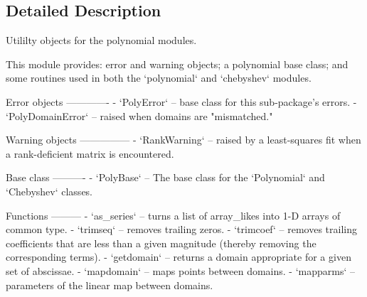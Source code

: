 \subsection{Detailed Description}
\begin{DoxyVerb}Utililty objects for the polynomial modules.

This module provides: error and warning objects; a polynomial base class;
and some routines used in both the `polynomial` and `chebyshev` modules.

Error objects
-------------
- `PolyError` -- base class for this sub-package's errors.
- `PolyDomainError` -- raised when domains are "mismatched."

Warning objects
---------------
- `RankWarning` -- raised by a least-squares fit when a rank-deficient
  matrix is encountered.

Base class
----------
- `PolyBase` -- The base class for the `Polynomial` and `Chebyshev`
  classes.

Functions
---------
- `as_series` -- turns a list of array_likes into 1-D arrays of common
  type.
- `trimseq` -- removes trailing zeros.
- `trimcoef` -- removes trailing coefficients that are less than a given
  magnitude (thereby removing the corresponding terms).
- `getdomain` -- returns a domain appropriate for a given set of abscissae.
- `mapdomain` -- maps points between domains.
- `mapparms` -- parameters of the linear map between domains.\end{DoxyVerb}
 

